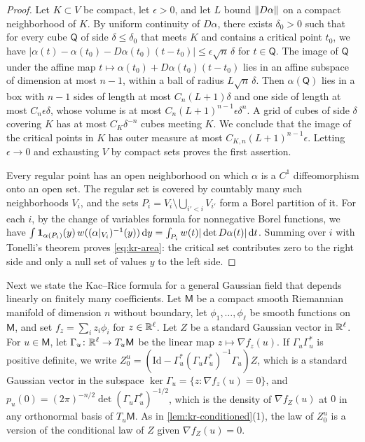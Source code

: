\begin{proof}
Let $K\subset V$ be compact, let $\epsilon>0$, and let $L$ bound $\left\lVert D\alpha\right\rVert$ on a compact neighborhood of $K$. By uniform continuity of $D\alpha$, there exists $\delta_0>0$ such that for every cube $\mathsf Q$ of side $\delta\le\delta_0$ that meets $K$ and contains a critical point $t_0$, we have $|\alpha(t)-\alpha(t_0)-D\alpha(t_0)(t-t_0)|\le\epsilon\sqrt n\,\delta$ for $t\in\mathsf Q$. The image of $\mathsf Q$ under the affine map $t\mapsto\alpha(t_0)+D\alpha(t_0)(t-t_0)$ lies in an affine subspace of dimension at most $n-1$, within a ball of radius $L\sqrt n\,\delta$. Then $\alpha(\mathsf Q)$ lies in a box with $n-1$ sides of length at most $C_n(L+1)\delta$ and one side of length at most $C_n\epsilon\delta$, whose volume is at most $C_n(L+1)^{n-1}\epsilon\delta^n$. A grid of cubes of side $\delta$ covering $K$ has at most $C_K\delta^{-n}$ cubes meeting $K$. We conclude that the image of the critical points in $K$ has outer measure at most $C_{K,n}(L+1)^{n-1}\epsilon$. Letting $\epsilon\to0$ and exhausting $V$ by compact sets proves the first assertion.

Every regular point has an open neighborhood on which $\alpha$ is a $C^1$ diffeomorphism onto an open set. The regular set is covered by countably many such neighborhoods $V_i$, and the sets $P_i=V_i\setminus\bigcup_{i'<i}V_{i'}$ form a Borel partition of it. For each $i$, by the change of variables formula for nonnegative Borel functions, we have $\int\mathbf 1_{\alpha(P_i)}(y)\,w((\alpha|_{V_i})^{-1}(y))\,\mathrm d y=\int_{P_i}w(t)|\det D\alpha(t)|\,\mathrm d t$. Summing over $i$ with Tonelli's theorem proves \eqref{eq:kr-area}: the critical set contributes zero to the right side and only a null set of values $y$ to the left side.
\end{proof}

Next we state the Kac--Rice formula for a general Gaussian field that depends linearly on finitely many coefficients. Let $\mathsf M$ be a compact smooth Riemannian manifold of dimension $n$ without boundary, let $\phi_1,\dots,\phi_\ell$ be smooth functions on $\mathsf M$, and set $f_z=\sum_iz_i\phi_i$ for $z\in\mathbb R^\ell$. Let $Z$ be a standard Gaussian vector in $\mathbb R^\ell$. For $u\in\mathsf M$, let $\Gamma_u\colon\mathbb R^\ell\to T_u\mathsf M$ be the linear map $z\mapsto\nabla f_z(u)$. If $\Gamma_u\Gamma_u^{*}$ is positive definite, we write $Z^u_0=(\mathrm{Id}-\Gamma_u^{*}(\Gamma_u\Gamma_u^{*})^{-1}\Gamma_u)Z$, which is a standard Gaussian vector in the subspace $\ker\Gamma_u=\{z:\nabla f_z(u)=0\}$, and $p_u(0)=(2\pi)^{-n/2}\det(\Gamma_u\Gamma_u^{*})^{-1/2}$, which is the density of $\nabla f_Z(u)$ at $0$ in any orthonormal basis of $T_u\mathsf M$. As in \cref{lem:kr-conditioned}(1), the law of $Z^u_0$ is a version of the conditional law of $Z$ given $\nabla f_Z(u)=0$.

